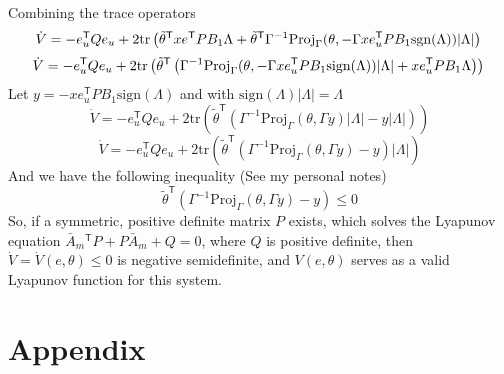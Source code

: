 Combining the trace operators
\begin{equation*}
  \dot{V}=-e_{u}^{\mathsf{T}}Qe_{u}
  +2\text{tr}\left(\tilde{\theta}^{\mathsf{T}}xe^{\mathsf{T}}PB_{1}\Lambda+
  {\tilde{\theta}}^{\mathsf{T}}\Gamma^{-1}\text{Proj}_{\Gamma}(\theta,-\Gamma xe_{u}^{\mathsf{T}}PB_{1}\text{sgn}(\Lambda))|\Lambda|\right) \\
\end{equation*}
\begin{equation*}
  \dot{V}=-e_{u}^{\mathsf{T}}Qe_{u}
  +2\text{tr}\left(\tilde{\theta}^{\mathsf{T}}\left(\Gamma^{-1}\text{Proj}_{\Gamma}(\theta,-\Gamma xe_{u}^{\mathsf{T}}PB_{1}\text{sign}(\Lambda))|\Lambda|+xe_{u}^{\mathsf{T}}PB_{1}\Lambda\right)\right) \\
\end{equation*}
Let $y=-xe_{u}^{\mathsf{T}}PB_{1}\text{sign}(\Lambda)$ and with $\text{sign}(\Lambda)|\Lambda|=\Lambda$
\begin{equation*}
  \dot{V}=-e_{u}^{\mathsf{T}}Qe_{u}
  +2\text{tr}\left(\tilde{\theta}^{\mathsf{T}}\left(\Gamma^{-1}\text{Proj}_{\Gamma}(\theta,\Gamma y)|\Lambda|-y|\Lambda|\right)\right)
\end{equation*}
\begin{equation*}
  \dot{V}=-e_{u}^{\mathsf{T}}Qe_{u}
  +2\text{tr}\left(\tilde{\theta}^{\mathsf{T}}\left(\Gamma^{-1}\text{Proj}_{\Gamma}(\theta,\Gamma y)-y\right)|\Lambda|\right)
\end{equation*}
And we have the following inequality (See my personal notes)
\begin{equation*}
  \tilde{\theta}^{\mathsf{T}}(\Gamma^{-1}\text{Proj}_{\Gamma}(\theta,\Gamma y)-y)\leq 0
\end{equation*}
So, if a symmetric, positive definite matrix $P$ exists, which solves the Lyapunov equation $\bar{A}_{m}{}^{\mathsf{T}}P+P\bar{A}_{m}+Q=0$, where $Q$ is positive definite, then $\dot{V}=\dot{V}(e,\theta)\leq 0$ is negative semidefinite, and $V(e,\theta)$ serves as a valid Lyapunov function for this system.

\chapter{Appendix}

